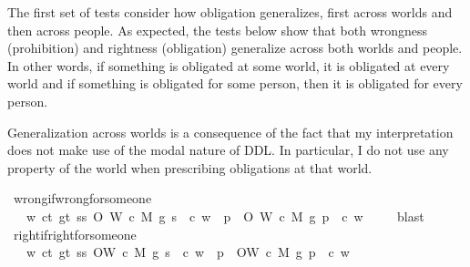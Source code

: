 \begin{isabellebody}
\begin{isamarkuptext}
The first set of tests consider how obligation generalizes, first across worlds and then across
people. As expected, the tests below show that both wrongness (prohibition) and rightness (obligation)
generalize across both worlds and people. In other words, if something is obligated at some world, it 
is obligated at every world and if something is obligated for some person, then it is obligated for 
every person. 

Generalization across worlds is a consequence of the fact that my interpretation does not make use of the 
modal nature of DDL. In particular, I do not use any property of the world when prescribing obligations 
at that world.%
\end{isamarkuptext}\isamarkuptrue%
\isamarkupfalse%
\ wrong{\isacharunderscore}if{\isacharunderscore}wrong{\isacharunderscore}for{\isacharunderscore}someone{\isacharcolon}\isanewline
\ \ \ {\isachardoublequoteopen}{\isasymforall}w{\isachardot}\ {\isasymforall}c{\isacharcolon}{\isacharcolon}t{\isachardot}\ {\isasymforall}g{\isacharcolon}{\isacharcolon}t{\isachardot}\ {\isasymexists}s{\isacharcolon}{\isacharcolon}s{\isachardot}\ O{\isacharbraceleft}\isactrlbold {\isasymnot}\ {\isacharparenleft}W\ {\isacharparenleft}c{\isacharcomma}\ M{\isacharcomma}\ g{\isacharparenright}\ s{\isacharparenright}\ {\isacharbar}\ c{\isacharbraceright}\ w\ {\isasymlongrightarrow}\ {\isacharparenleft}{\isasymforall}p{\isachardot}\ \ O{\isacharbraceleft}\isactrlbold {\isasymnot}\ {\isacharparenleft}W\ {\isacharparenleft}c{\isacharcomma}\ M{\isacharcomma}\ g{\isacharparenright}\ p{\isacharparenright}\ {\isacharbar}\ c{\isacharbraceright}\ w{\isacharparenright}\ {\isachardoublequoteclose}\isanewline
%
\isadelimproof
\ \ %
\endisadelimproof
%
\isatagproof
{}\isamarkupfalse%
\ blast%
\endisatagproof
{\isafoldproof}%
%
\isadelimproof
\isanewline
%
\endisadelimproof
\isanewline
{}\isamarkupfalse%
\ right{\isacharunderscore}if{\isacharunderscore}right{\isacharunderscore}for{\isacharunderscore}someone{\isacharcolon}\isanewline
\ \ \ {\isachardoublequoteopen}{\isasymforall}w{\isachardot}\ {\isasymforall}c{\isacharcolon}{\isacharcolon}t{\isachardot}\ {\isasymforall}g{\isacharcolon}{\isacharcolon}t{\isachardot}\ {\isasymexists}s{\isacharcolon}{\isacharcolon}s{\isachardot}\ O{\isacharbraceleft}W\ {\isacharparenleft}c{\isacharcomma}\ M{\isacharcomma}\ g{\isacharparenright}\ s\ {\isacharbar}\ c{\isacharbraceright}\ w\ {\isasymlongrightarrow}\ {\isacharparenleft}{\isasymforall}p{\isachardot}\ \ O{\isacharbraceleft}W\ {\isacharparenleft}c{\isacharcomma}\ M{\isacharcomma}\ g{\isacharparenright}\ p\ {\isacharbar}\ c{\isacharbraceright}\ w{\isacharparenright}\ {\isachardoublequoteclose}\isanewline

\end{isabellebody}
